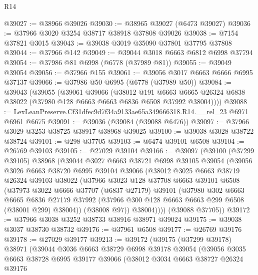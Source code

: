 \begin{lexlean}{R14}
\begin{coremodule}
@39027 := @38966 @39026
@39030 := @38965 @39027 (@6473 @39027)
@39036 := @37966 @3020 @3254 @38717 @38918 @37808 @39026
@39038 := @7154 @37821 @3015
@39043 := @39038 @3019 @35090 @37801 @37795 @37808
@39044 := @37966 @142
@39049 := @39044 @3018 @6663 @6812 @6998 @37794
@39054 := @37986 @81 @6998 (@6778 (@37989 @81))
@39055 := @39049 @39054
@39056 := @37966 @155
@39061 := @39056 @3017 @6663 @6666 @6995 @37137
@39066 := @37986 @50 @6995 (@6778 (@37989 @50))
@39084 := @39043
    (@39055
      (@39061
        @39066
        (@38012
          @191
          @6663
          @6665
          @26324
          @6838
          @38022
          (@37980 @128 @6663 @6663 @6836 @6508 @37992 @38004))))
@39088 := LexLeanPreserve.Cf31dfec9d7f34a9133ae65a349666318.R14.__rel_23 @6971 @6961 @6675
@39091 := @39036 (@39084 (@39088 @6476))
@39097 := @37966 @3029 @3253 @38725 @38917 @38968 @39025
@39100 := @39038 @3028 @38722 @38724
@39101 := @298 @37705
@39103 := @6474 @39101 @6508
@39104 := @26769 @39103
@39105 := @27029 @39104
@39166 := @39097
    (@39100
      (@37299 @39105)
      @38968
      (@39044
        @3027
        @6663
        @38721
        @6998
        @39105
        @39054
        (@39056
          @3026
          @6663
          @38720
          @6995
          @39104
          @39066
          (@38012
            @3025
            @6663
            @38719
            @26324
            @39103
            @38022
            (@37966
              @3023
              @128
              @37708
              @6663
              @39101
              @6508
              (@37973
                @3022
                @6666
                @37707
                (@6837 @27179)
                @39101
                (@37980
                  @302
                  @6663
                  @6665
                  @6836
                  @27179
                  @37992
                  (@37966 @300 @128 @6663 @6663 @299 @6508 (@38001 @299) @38004))
                (@38008 @97))
              @38004))))
      (@39088 @37705))
@39172 := @37966 @3038 @3252 @38733 @38916 @38971 @39024
@39175 := @39038 @3037 @38730 @38732
@39176 := @37961 @6508
@39177 := @26769 @39176
@39178 := @27029 @39177
@39213 := @39172
    (@39175
      (@37299 @39178)
      @38971
      (@39044
        @3036
        @6663
        @38729
        @6998
        @39178
        @39054
        (@39056
          @3035
          @6663
          @38728
          @6995
          @39177
          @39066
          (@38012
            @3034
            @6663
            @38727
            @26324
            @39176

\end{coremodule}
\end{lexlean}
